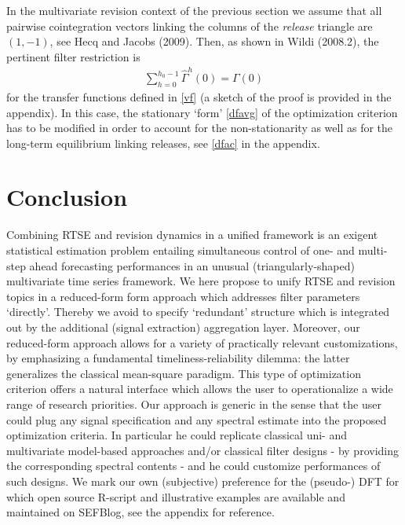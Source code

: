 \documentclass[11pt]{article}
\begin{document}
In the multivariate revision context of the previous section we assume that all pairwise cointegration vectors linking the columns of the \emph{release} triangle  are $(1,-1)$, see Hecq and Jacobs (2009). Then, as shown in Wildi (2008.2), the pertinent filter restriction is
\begin{eqnarray}\label{co}
\sum_{h=0}^{h_0-1}\hat{\Gamma}^h(0)=\Gamma(0)
\end{eqnarray}
for the transfer functions defined in \ref{vf} (a sketch of the proof is provided in the appendix). In this case, the stationary `form' \ref{dfavg} of the optimization criterion has to be modified in order to account for the non-stationarity as well as for the long-term equilibrium linking releases, see \ref{dfac} in the appendix.



\section{Conclusion} \label{concl}



Combining RTSE and revision dynamics in a unified framework is an exigent statistical estimation problem entailing simultaneous control of one- and multi-step ahead forecasting performances in an unusual (triangularly-shaped) multivariate time series framework. We here propose to unify RTSE and revision topics in a reduced-form form approach which addresses filter parameters `directly'. Thereby we avoid to specify `redundant' structure which is integrated out by the additional (signal extraction) aggregation layer. Moreover, our reduced-form approach allows for a variety of practically relevant customizations, by emphasizing a fundamental timeliness-reliability dilemma: the latter generalizes the classical mean-square paradigm. This type of optimization criterion offers a natural interface which allows the user to operationalize a wide range of research priorities. Our approach is generic in the sense that the user could plug any signal specification and any spectral estimate into the proposed optimization criteria. In particular he could replicate classical uni- and multivariate model-based approaches and/or classical filter designs - by providing the corresponding spectral contents - and he could customize performances of such designs. We mark our own (subjective) preference for the (pseudo-) DFT for which open source R-script and illustrative examples are available and maintained on SEFBlog, see the appendix for reference.
\end{document}
